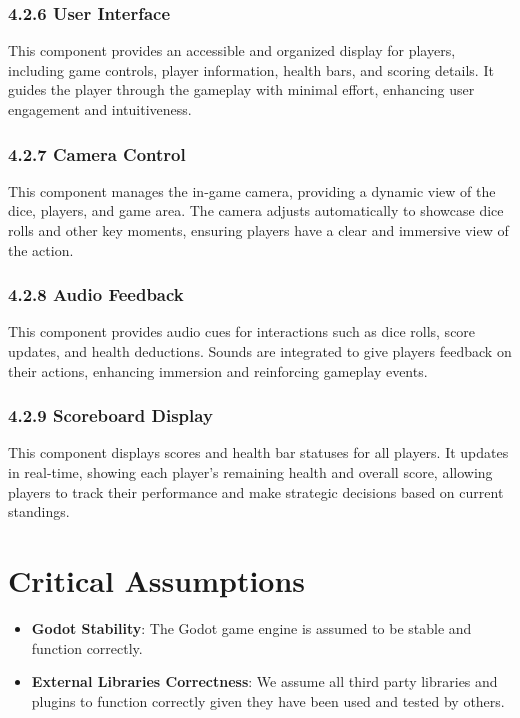 \documentclass{article}
\begin{document}
\subsubsection*{4.2.6 User Interface} \label{UI}
This component provides an accessible and organized display for players, including game controls, player information, health bars, and scoring details. It guides the player through the gameplay with minimal effort, enhancing user engagement and intuitiveness.

\subsubsection*{4.2.7 Camera Control} \label{CC}
This component manages the in-game camera, providing a dynamic view of the dice, players, and game area. The camera adjusts automatically to showcase dice rolls and other key moments, ensuring players have a clear and immersive view of the action.

\subsubsection*{4.2.8 Audio Feedback} \label{AF}
This component provides audio cues for interactions such as dice rolls, score updates, and health deductions. Sounds are integrated to give players feedback on their actions, enhancing immersion and reinforcing gameplay events.

\subsubsection*{4.2.9 Scoreboard Display} \label{SD}
This component displays scores and health bar statuses for all players. It updates in real-time, showing each player's remaining health and overall score, allowing players to track their performance and make strategic decisions based on current standings.

\section{Critical Assumptions}

\begin{itemize}
    \item \textbf{Godot Stability}: The Godot game engine is assumed to be stable and function correctly.
    \item \textbf{External Libraries Correctness}: We assume all third party libraries and plugins to function correctly given they have been used and tested by others.
\end{itemize}
\end{document}
